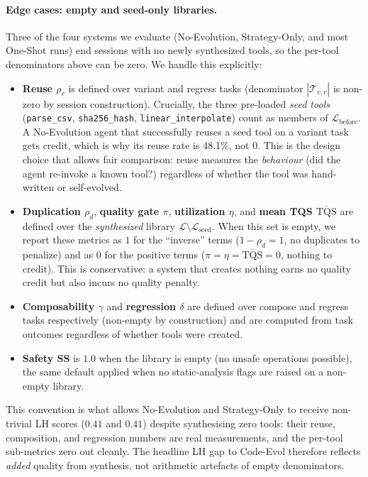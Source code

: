 \documentclass[sigconf,anonymous,review,natbib=false]{acmart}
\begin{document}
\paragraph{Edge cases: empty and seed-only libraries.}
Three of the four systems we evaluate (No-Evolution, Strategy-Only, and most One-Shot runs) end sessions with no newly synthesized tools, so the per-tool denominators above can be zero. We handle this explicitly:
\begin{itemize}
\item \textbf{Reuse $\rho_r$} is defined over variant and regress tasks (denominator $|\mathcal{T}_{v,r}|$ is non-zero by session construction). Crucially, the three pre-loaded \emph{seed tools} (\texttt{parse\_csv}, \texttt{sha256\_hash}, \texttt{linear\_interpolate}) count as members of $\mathcal{L}_{\text{before}}$. A No-Evolution agent that successfully reuses a seed tool on a variant task gets credit, which is why its reuse rate is 48.1\%, not 0. This is the design choice that allows fair comparison: reuse measures the \emph{behaviour} (did the agent re-invoke a known tool?) regardless of whether the tool was hand-written or self-evolved.
\item \textbf{Duplication $\rho_d$}, \textbf{quality gate $\pi$}, \textbf{utilization $\eta$}, and \textbf{mean TQS $\overline{\text{TQS}}$} are defined over the \emph{synthesized} library $\mathcal{L} \setminus \mathcal{L}_{\text{seed}}$. When this set is empty, we report these metrics as $1$ for the ``inverse'' terms ($1-\rho_d=1$, no duplicates to penalize) and as $0$ for the positive terms ($\pi=\eta=\overline{\text{TQS}}=0$, nothing to credit). This is conservative: a system that creates nothing earns no quality credit but also incurs no quality penalty.
\item \textbf{Composability $\gamma$} and \textbf{regression $\delta$} are defined over compose and regress tasks respectively (non-empty by construction) and are computed from task outcomes regardless of whether tools were created.
\item \textbf{Safety SS} is $1.0$ when the library is empty (no unsafe operations possible), the same default applied when no static-analysis flags are raised on a non-empty library.
\end{itemize}
This convention is what allows No-Evolution and Strategy-Only to receive non-trivial LH scores ($0.41$ and $0.41$) despite synthesising zero tools: their reuse, composition, and regression numbers are real measurements, and the per-tool sub-metrics zero out cleanly. The headline LH gap to Code-Evol therefore reflects \emph{added} quality from synthesis, not arithmetic artefacts of empty denominators.
\end{document}
